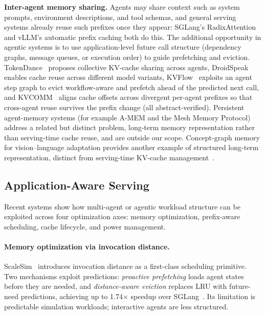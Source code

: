 \textbf{Inter-agent memory sharing.} Agents may share context such as system prompts, environment descriptions, and tool schemas, and general serving systems already reuse such prefixes once they appear: SGLang's RadixAttention and vLLM's automatic prefix caching both do this. The additional opportunity in agentic systems is to use application-level future call structure (dependency graphs, message queues, or execution order) to guide prefetching and eviction. TokenDance~\cite{tokendance2026} proposes collective KV-cache sharing across agents, DroidSpeak~\cite{droidspeak2024} enables cache reuse across different model variants, KVFlow~\cite{kvflow2025} exploits an agent step graph to evict workflow-aware and prefetch ahead of the predicted next call, and KVCOMM~\cite{kvcomm2025} aligns cache offsets across divergent per-agent prefixes so that cross-agent reuse survives the prefix change (all abstract-verified). Persistent agent-memory systems (for example A-MEM and the Mesh Memory Protocol) address a related but distinct problem, long-term memory representation rather than serving-time cache reuse, and are outside our scope. Concept-graph memory for vision--language adaptation provides another example of structured long-term representation, distinct from serving-time KV-cache management~\cite{zhou2026comem}.

\subsection{Application-Aware Serving}\label{sec:infra_scalesim}

Recent systems show how multi-agent or agentic workload structure can be exploited across four optimization axes: memory optimization, prefix-aware scheduling, cache lifecycle, and power management.

\paragraph*{Memory optimization via invocation distance.}
ScaleSim~\cite{zhou2026} introduces invocation distance as a first-class scheduling primitive. Two mechanisms exploit predictions: \emph{proactive prefetching} loads agent states before they are needed, and \emph{distance-aware eviction} replaces LRU with future-need predictions, achieving up to 1.74$\times$ speedup over SGLang~\cite{zhou2026}. Its limitation is predictable simulation workloads; interactive agents are less structured.

